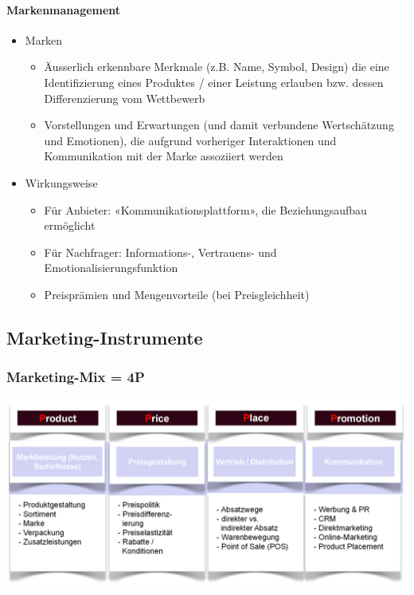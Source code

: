 \paragraph{Markenmanagement}
\begin{itemize}
	\item Marken
	\begin{itemize}
		\item Äusserlich erkennbare Merkmale (z.B. Name, Symbol, Design) die eine Identifizierung eines Produktes / einer Leistung erlauben bzw. dessen Differenzierung vom Wettbewerb
		\item Vorstellungen und Erwartungen (und damit verbundene Wertschätzung und Emotionen), die aufgrund vorheriger Interaktionen und Kommunikation mit der Marke assoziiert werden
	\end{itemize}
	\item Wirkungsweise
	\begin{itemize}
		\item Für Anbieter: «Kommunikationsplattform», die Beziehungsaufbau ermöglicht
		\item Für Nachfrager: Informations-, Vertrauens- und Emotionalisierungsfunktion
		\item Preisprämien und Mengenvorteile (bei Preisgleichheit)
	\end{itemize}
\end{itemize}

\subsection{Marketing-Instrumente}
\subsubsection{Marketing-Mix = 4P}
\includegraphics[width=1\linewidth]{images/4p}

